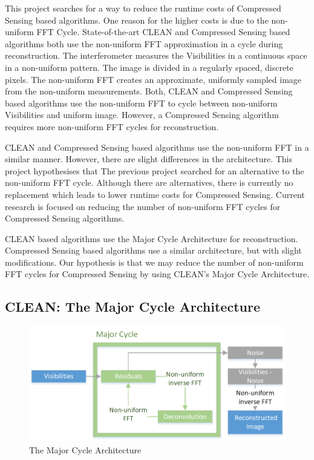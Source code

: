 This project searches for a way to reduce the runtime costs of Compressed Sensing based algorithms. One reason for the higher costs is due to the non-uniform FFT Cycle. State-of-the-art CLEAN and Compressed Sensing based algorithms both use the non-uniform FFT approximation in a cycle during reconstruction. The interferometer measures the Visibilities in a continuous space in a non-uniform pattern. The image is divided in a regularly spaced, discrete pixels. The non-uniform FFT creates an approximate, uniformly sampled image from the non-uniform measurements. Both, CLEAN and Compressed Sensing based algorithms use the non-uniform FFT to cycle between non-uniform Visibilities and uniform image. However, a Compressed Sensing algorithm requires more non-uniform FFT cycles for reconstruction. 

CLEAN and Compressed Sensing based algorithms use the non-uniform FFT in a similar manner. However, there are slight differences in the architecture. This project hypothesises that 
The previous project searched for an alternative to the non-uniform FFT cycle. Although there are alternatives, there is currently no replacement which leads to lower runtime costs for Compressed Sensing. Current research is focused on reducing the number of non-uniform FFT cycles for Compressed Sensing algorithms.

CLEAN based algorithms use the Major Cycle Architecture for reconstruction. Compressed Sensing based algorithms use a similar architecture, but with slight modifications. Our hypothesis is that we may reduce the number of non-uniform FFT cycles for Compressed Sensing by using CLEAN's Major Cycle Architecture.

\subsection{CLEAN: The Major Cycle Architecture}

\begin{figure}[h]
	\centering
	\includegraphics[width=0.80\linewidth]{./chapters/02.hypo/Major-Minor.png}
	\caption{The Major Cycle Architecture}
	\label{hypo:major}
\end{figure}


